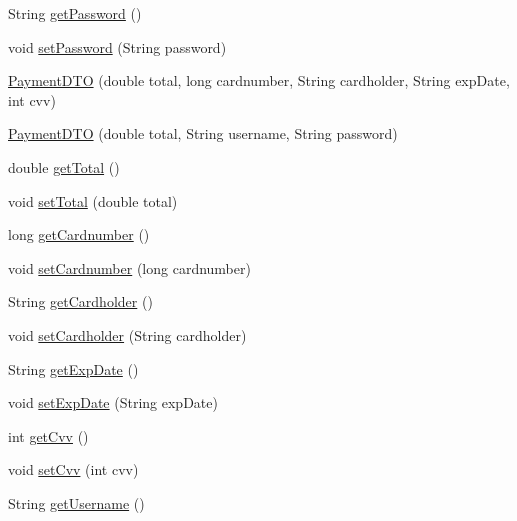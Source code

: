 \begin{DoxyCompactItemize}
\item 
String \mbox{\hyperlink{class_s_p_q_1_1dto_1_1_payment_d_t_o_ae012449dd0baea7f169bb64dcf973dec}{get\+Password}} ()
\item 
void \mbox{\hyperlink{class_s_p_q_1_1dto_1_1_payment_d_t_o_a51a5daa487df2578ca39ede7ae705fb6}{set\+Password}} (String password)
\item 
\mbox{\hyperlink{class_s_p_q_1_1dto_1_1_payment_d_t_o_a4a6f91d0976ce0af97a8f7f15658294c}{Payment\+D\+TO}} (double total, long cardnumber, String cardholder, String exp\+Date, int cvv)
\item 
\mbox{\hyperlink{class_s_p_q_1_1dto_1_1_payment_d_t_o_ab51beb9eef60e0b57b11bab85ce42454}{Payment\+D\+TO}} (double total, String username, String password)
\item 
double \mbox{\hyperlink{class_s_p_q_1_1dto_1_1_payment_d_t_o_a04cd2104d07971407126fcf75ef17d5b}{get\+Total}} ()
\item 
void \mbox{\hyperlink{class_s_p_q_1_1dto_1_1_payment_d_t_o_a07f242511a5b2cd45fdf771203729c1b}{set\+Total}} (double total)
\item 
long \mbox{\hyperlink{class_s_p_q_1_1dto_1_1_payment_d_t_o_ac2a8a2ab315f3027f25780a84da0b824}{get\+Cardnumber}} ()
\item 
void \mbox{\hyperlink{class_s_p_q_1_1dto_1_1_payment_d_t_o_a2b84f1e7da9d3d9966d5170ae0595839}{set\+Cardnumber}} (long cardnumber)
\item 
String \mbox{\hyperlink{class_s_p_q_1_1dto_1_1_payment_d_t_o_ac4812465bc4dd874aad6269fe8486e0b}{get\+Cardholder}} ()
\item 
void \mbox{\hyperlink{class_s_p_q_1_1dto_1_1_payment_d_t_o_a5eea0a93b97ba73b36358c6f5e0ca42e}{set\+Cardholder}} (String cardholder)
\item 
String \mbox{\hyperlink{class_s_p_q_1_1dto_1_1_payment_d_t_o_aa91402a8c96a306fcf125973e4f35912}{get\+Exp\+Date}} ()
\item 
void \mbox{\hyperlink{class_s_p_q_1_1dto_1_1_payment_d_t_o_a6d3d88f07321648bc17e385432ee9044}{set\+Exp\+Date}} (String exp\+Date)
\item 
int \mbox{\hyperlink{class_s_p_q_1_1dto_1_1_payment_d_t_o_a64fb9df59333fcc2a0c8bea48024354d}{get\+Cvv}} ()
\item 
void \mbox{\hyperlink{class_s_p_q_1_1dto_1_1_payment_d_t_o_aee98ca86c3d7e05f98e387faa4f5a3d4}{set\+Cvv}} (int cvv)
\item 
String \mbox{\hyperlink{class_s_p_q_1_1dto_1_1_payment_d_t_o_a31d0edbb3ec64b406e70cd3deaa5ab1a}{get\+Username}} ()
\item 

\end{DoxyCompactItemize}
